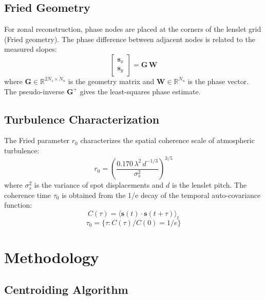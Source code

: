 \documentclass[twocolumn,10pt]{IEEEtran}
\begin{document}
\subsection{Fried Geometry}
\label{sec:fried}

For zonal reconstruction, phase nodes are placed at the corners of the lenslet grid (Fried geometry). The phase difference between adjacent nodes is related to the measured slopes:
\begin{equation}
\begin{bmatrix}
\mathbf{s}_x \\ \mathbf{s}_y
\end{bmatrix} =
\mathbf{G}\,\mathbf{W}
\end{equation}
where $\mathbf{G} \in \mathbb{R}^{2N_s \times N_n}$ is the geometry matrix and $\mathbf{W} \in \mathbb{R}^{N_n}$ is the phase vector. The pseudo-inverse $\mathbf{G}^{+}$ gives the least-squares phase estimate.

\subsection{Turbulence Characterization}
\label{sec:turbulence}

The Fried parameter $r_0$ characterizes the spatial coherence scale of atmospheric turbulence:
\begin{equation}
r_0 = \left(\frac{0.170\,\lambda^2\,d^{-1/3}}{\sigma_s^2}\right)^{3/5}
\end{equation}
where $\sigma_s^2$ is the variance of spot displacements and $d$ is the lenslet pitch. The coherence time $\tau_0$ is obtained from the 1/e decay of the temporal auto-covariance function:
\begin{equation}
C(\tau) = \langle\mathbf{s}(t)\cdot\mathbf{s}(t+\tau)\rangle_t
\end{equation}
\begin{equation}
\tau_0 = \{\tau : C(\tau)/C(0) = 1/e\}
\end{equation}

\section{Methodology}
\label{sec:method}

\subsection{Centroiding Algorithm}
\label{sec:centroid}
\end{document}
